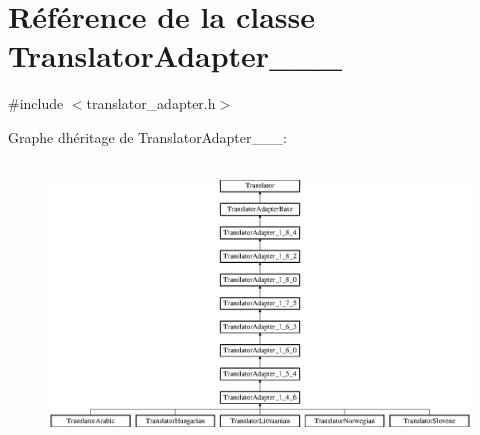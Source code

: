 \hypertarget{class_translator_adapter__1__5__4}{}\section{Référence de la classe Translator\+Adapter\+\_\+\_\+\_}
\label{class_translator_adapter__1__5__4}


{\ttfamily \#include $<$translator\+\_\+adapter.\+h$>$}

Graphe d\textquotesingle{}héritage de Translator\+Adapter\+\_\+\_\+\_\+:\begin{figure}[H]
\begin{center}
\leavevmode
\includegraphics[height=7.512195cm]{class_translator_adapter__1__5__4}
\end{center}
\end{figure}
